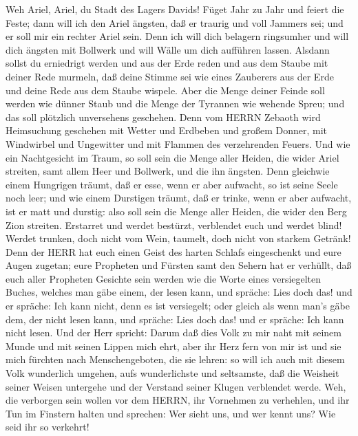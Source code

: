  Weh Ariel, Ariel, du Stadt des Lagers Davids! Füget Jahr zu
Jahr und feiert die Feste;  dann will ich den Ariel ängsten,
daß er traurig und voll Jammers sei; und er soll mir ein rechter Ariel
sein.  Denn ich will dich belagern ringsumher und will dich
ängsten mit Bollwerk und will Wälle um dich aufführen lassen.
 Alsdann sollst du erniedrigt werden und aus der Erde reden
und aus dem Staube mit deiner Rede murmeln, daß deine Stimme sei wie
eines Zauberers aus der Erde und deine Rede aus dem Staube wispele.
 Aber die Menge deiner Feinde soll werden wie dünner Staub
und die Menge der Tyrannen wie wehende Spreu; und das soll plötzlich
unversehens geschehen.  Denn vom HERRN Zebaoth wird
Heimsuchung geschehen mit Wetter und Erdbeben und großem Donner, mit
Windwirbel und Ungewitter und mit Flammen des verzehrenden Feuers.
 Und wie ein Nachtgesicht im Traum, so soll sein die Menge
aller Heiden, die wider Ariel streiten, samt allem Heer und Bollwerk,
und die ihn ängsten.  Denn gleichwie einem Hungrigen träumt,
daß er esse, wenn er aber aufwacht, so ist seine Seele noch leer; und
wie einem Durstigen träumt, daß er trinke, wenn er aber aufwacht, ist er
matt und durstig: also soll sein die Menge aller Heiden, die wider den
Berg Zion streiten.  Erstarret und werdet bestürzt,
verblendet euch und werdet blind! Werdet trunken, doch nicht vom Wein,
taumelt, doch nicht von starkem Getränk!  Denn der HERR hat
euch einen Geist des harten Schlafs eingeschenkt und eure Augen zugetan;
eure Propheten und Fürsten samt den Sehern hat er verhüllt,
 daß euch aller Propheten Gesichte sein werden wie die
Worte eines versiegelten Buches, welches man gäbe einem, der lesen kann,
und spräche: Lies doch das! und er spräche: Ich kann nicht, denn es ist
versiegelt;  oder gleich als wenn man's gäbe dem, der nicht
lesen kann, und spräche: Lies doch das! und er spräche: Ich kann nicht
lesen.  Und der Herr spricht: Darum daß dies Volk zu mir
naht mit seinem Munde und mit seinen Lippen mich ehrt, aber ihr Herz
fern von mir ist und sie mich fürchten nach Menschengeboten, die sie
lehren:  so will ich auch mit diesem Volk wunderlich
umgehen, aufs wunderlichste und seltsamste, daß die Weisheit seiner
Weisen untergehe und der Verstand seiner Klugen verblendet werde.
 Weh, die verborgen sein wollen vor dem HERRN, ihr
Vornehmen zu verhehlen, und ihr Tun im Finstern halten und sprechen: Wer
sieht uns, und wer kennt uns?  Wie seid ihr so verkehrt!
